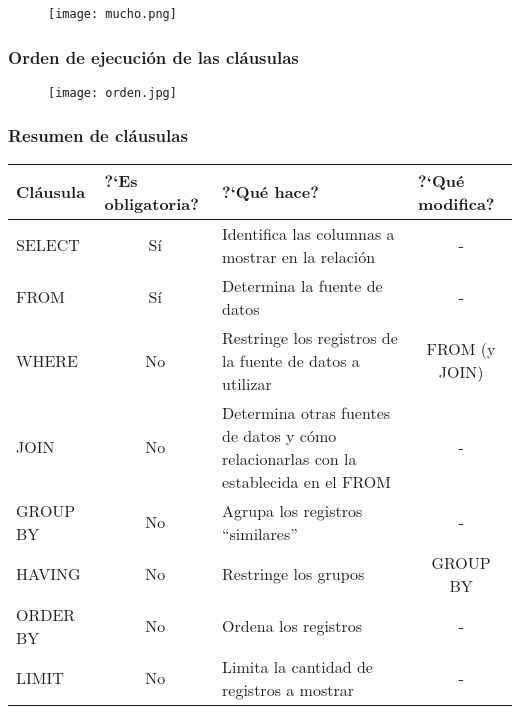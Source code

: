 
\begin{frame}
	
	\begin{figure}[h]
		\centering
		\texttt{[image: mucho.png]}
	\end{figure}
	
\end{frame}


\begin{frame}

	\frametitle{Orden de ejecución de las cláusulas}
	
	\begin{figure}[h]
		\centering
		\texttt{[image: orden.jpg]}
	\end{figure}

\end{frame}


\begin{frame}
	
	\frametitle{Resumen de cláusulas}

\begin{table}
	\begin{tabular}{|l|c|m{6cm}|c|}
		\hline 
		Cláusula & \multicolumn{1}{l|}{?`Es obligatoria?} & ?`Qu\'e hace? & \multicolumn{1}{l|}{?`Qu\'e modifica?} \\ \hline \hline
		SELECT & Sí & Identifica las columnas a mostrar en la relación & - \\ \hline
		FROM & Sí & Determina la fuente de datos & - \\ \hline
		WHERE & No & Restringe los registros de la fuente de datos a utilizar & FROM (y JOIN) \\ \hline
		JOIN & No & Determina otras fuentes de datos y cómo relacionarlas con la establecida en el FROM & - \\ \hline
		GROUP BY & No & Agrupa los registros ``similares''& - \\ \hline
		HAVING & No & Restringe los grupos & GROUP BY \\ \hline
		ORDER BY & No & Ordena los registros & - \\ \hline
		LIMIT & No & Limita la cantidad de registros a mostrar & - \\ \hline
	\end{tabular}
\end{table}




\end{frame}

